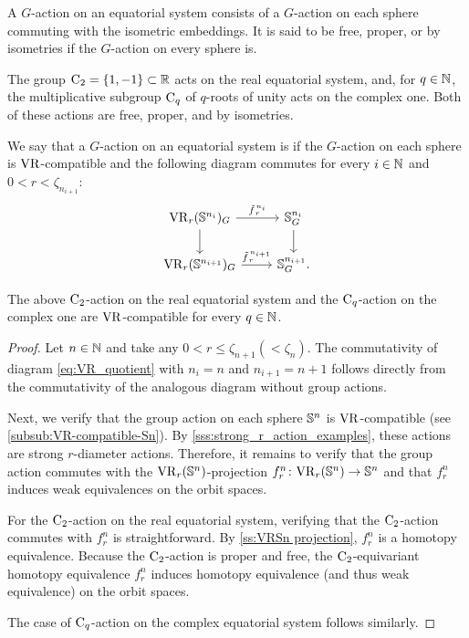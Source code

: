 A \(G\)-action on an equatorial system consists of a \(G\)-action on each sphere commuting with the isometric embeddings.
It is said to be free, proper, or by isometries if the \(G\)-action on every sphere is.

The group \(\mathrm{C}_2 = \{1,-1\} \subset \mathbb{R}\) acts on the real equatorial system, and, for \(q \in \mathbb{N}\), the multiplicative subgroup \(\mathrm{C}_q\) of \(q\)-roots of unity acts on the complex one.
Both of these actions are free, proper, and by isometries.

We say that a \(G\)-action on an equatorial system is  if the \(G\)-action on each sphere is \(\mathrm{VR}\)-compatible and the following diagram commutes for every \(i \in \mathbb{N}\) and $0 < r < \zeta_{n_{i+1}}$:
\begin{equation}\label{eq:VR_quotient}
    \begin{tikzcd}
	\VR_r(\bS^{n_i})_G
	\ar[d]
	\ar[r, "\tilde f_{\,r}^{\,n_i}" above]
	&
	\bS^{n_i}_G
	\ar[d]
	\\
	\VR_r(\bS^{n_{i+1}})_G
	\ar[r, "\tilde f_{\,r}^{\,n_{i+1}}" above]
	&
	\bS^{n_{i+1}}_G.
\end{tikzcd}
\end{equation}

\lemma The above \(\mathrm{C}_2\)-action on the real equatorial system and the \(\mathrm{C}_q\)-action on the complex one are \(\mathrm{VR}\)-compatible for every \(q \in \mathbb{N}\).

\begin{proof}
    Let $n \in \mathbb{N}$ and take any $0 < r \leq \zeta_{n+1} (< \zeta_{n})$.
    The commutativity of diagram \ref{eq:VR_quotient} with $n_i = n$ and $n_{i+1} = n+1$ follows directly from the commutativity of the analogous diagram without group actions.

    Next, we verify that the group action on each sphere $\mathbb{S}^n$ is \(\mathrm{VR}\)-compatible (see \cref{subsub:VR-compatible-Sn}).
    By \cref{sss:strong_r_action_examples}, these actions are strong \(r\)-diameter actions. 
    Therefore, it remains to verify that the group action commutes with the $\mathrm{VR}_r(\mathbb{S}^{n})$-projection $f_r^{n}\colon \mathrm{VR}_r(\mathbb{S}^{n}) \to \mathbb{S}^{n}$ and that $f_r^{n}$ induces weak equivalences on the orbit spaces.

    For the $\mathrm{C}_2$-action on the real equatorial system, verifying that the $\mathrm{C}_2$-action commutes with $f_r^{n}$ is straightforward.
    By \cref{ss:VRSn projection}, $f_r^{n}$ is a homotopy equivalence.
    Because the $\mathrm{C}_2$-action is proper and free, the $\mathrm{C}_2$-equivariant homotopy equivalence $f_r^n$ induces homotopy equivalence (and thus weak equivalence) on the orbit spaces.

    The case of $\mathrm{C}_q$-action on the complex equatorial system follows similarly.
\end{proof}

